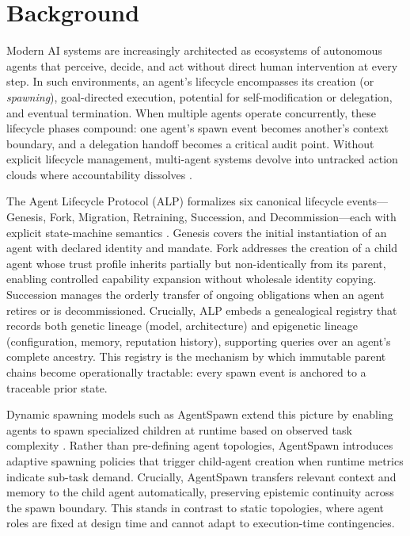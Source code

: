 \section{Background}


Modern AI systems are increasingly architected as ecosystems of autonomous agents that perceive, decide, and act without direct human intervention at every step. In such environments, an agent's lifecycle encompasses its creation (or \emph{spawning}), goal-directed execution, potential for self-modification or delegation, and eventual termination. When multiple agents operate concurrently, these lifecycle phases compound: one agent's spawn event becomes another's context boundary, and a delegation handoff becomes a critical audit point. Without explicit lifecycle management, multi-agent systems devolve into untracked action clouds where accountability dissolves \cite{wang2024identity}.

The Agent Lifecycle Protocol (ALP) formalizes six canonical lifecycle events---Genesis, Fork, Migration, Retraining, Succession, and Decommission---each with explicit state-machine semantics \cite{alp2025}. Genesis covers the initial instantiation of an agent with declared identity and mandate. Fork addresses the creation of a child agent whose trust profile inherits partially but non-identically from its parent, enabling controlled capability expansion without wholesale identity copying. Succession manages the orderly transfer of ongoing obligations when an agent retires or is decommissioned. Crucially, ALP embeds a genealogical registry that records both genetic lineage (model, architecture) and epigenetic lineage (configuration, memory, reputation history), supporting queries over an agent's complete ancestry. This registry is the mechanism by which immutable parent chains become operationally tractable: every spawn event is anchored to a traceable prior state.

Dynamic spawning models such as AgentSpawn extend this picture by enabling agents to spawn specialized children at runtime based on observed task complexity \cite{agentspawn2025}. Rather than pre-defining agent topologies, AgentSpawn introduces adaptive spawning policies that trigger child-agent creation when runtime metrics indicate sub-task demand. Crucially, AgentSpawn transfers relevant context and memory to the child agent automatically, preserving epistemic continuity across the spawn boundary. This stands in contrast to static topologies, where agent roles are fixed at design time and cannot adapt to execution-time contingencies.

